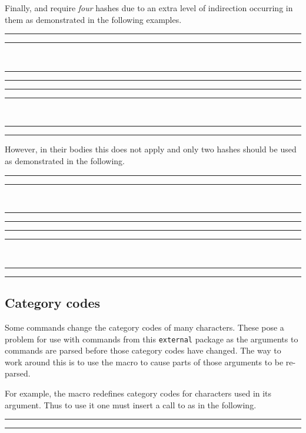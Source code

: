 \documentclass[10pt]{ltxdoc}
\newcommand{\pkg}[1]{\texttt{#1}}
\def\sz{%
  \rule{0.2em}{7pt}%
  \llap{\rule[8pt]{0.2em}{2pt}}%
}
\begin{document}
Finally,  and  require \textit{four}
hashes due to an extra level of indirection occurring in them as
demonstrated in the following examples.

\begin{tcblisting}{}
\sz\newexternal[preamble={\newcommand{\p}[1]{(####1)}}]{\paren}\sz~%
\sz{}\sz
\end{tcblisting}

\begin{tcblisting}{}
\sz{}\sz~%
\sz\begin{paren}\end{paren}\sz
\end{tcblisting}

However, in their bodies this does not apply and only two hashes should be used
as demonstrated in the following.

\begin{tcblisting}{}
\sz\newexternal{\paren}\sz~%
\sz{}\sz
\end{tcblisting}

\begin{tcblisting}{}
\sz{}\sz~%
\sz
{}
\sz
\end{tcblisting}

\subsection{Category codes}
\label{subsec:Catcodes}

Some commands change the category codes of many characters.
These pose a problem for use with commands from this \pkg{external}
package as the arguments to commands are parsed before those category
codes have changed.
The way to work around this is to use the  macro to
cause parts of those arguments to be re-parsed.

For example, the  macro redefines category codes
for characters used in its argument.
Thus to use it one must insert a call to  as in the
following.

\begin{tcblisting}{}
\sz
{}%
\sz
\end{tcblisting}
\end{document}
